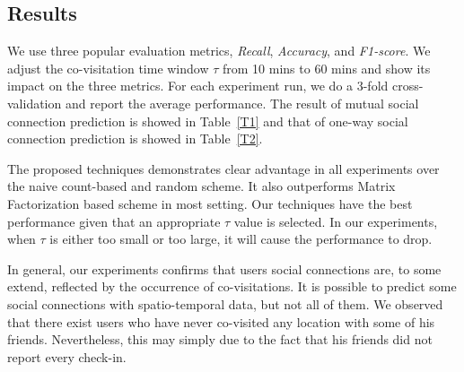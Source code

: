 \subsection{Results}

We use three popular evaluation metrics, \textit{Recall}, \textit{Accuracy}, and \textit{F1-score}. We adjust the co-visitation time window $\tau$ from 10 mins to 60 mins and show its impact on the three metrics. For each experiment run, we do a 3-fold cross-validation and report the average performance. The result of mutual social connection prediction is showed in Table~\ref{T1} and that of one-way social connection prediction is showed in Table~\ref{T2}.

The proposed techniques demonstrates clear advantage in all experiments over the naive count-based and random scheme. It also outperforms Matrix Factorization based scheme in most setting. Our techniques have the best performance given that an appropriate $\tau$ value is selected. In our experiments, when $\tau$ is either too small or too large, it will cause the performance to drop.

In general, our experiments confirms that users social connections are, to some extend, reflected by the occurrence of co-visitations. It is possible to predict some social connections with spatio-temporal data, but not all of them. We observed that there exist users who have never co-visited any location with some of his friends. Nevertheless, this may simply due to the fact that his friends did not report every check-in. 